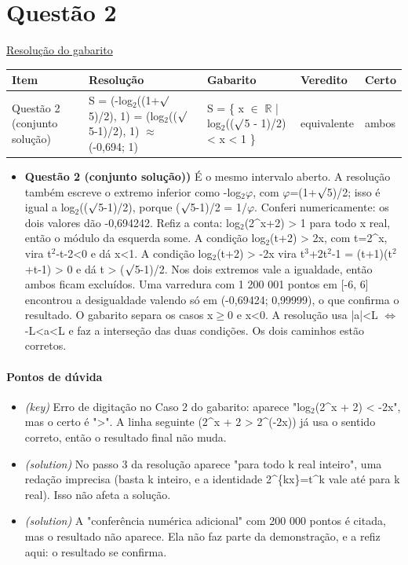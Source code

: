 \documentclass{article}%
\begin{document}
\section*{Questão 2}%
\href{https://poliedroresolve.sistemapoliedro.com.br/vestibulares/ita/2027/ita-2-fase-dia-1-20-10-2026-2-fase-dia-1/dissertativa-2-matematica-2-fase-dia-1-ita-2027}{Resolução do gabarito}\par\smallskip%
\begin{longtable}{@{}p{} p{} p{} p{} p{}@{}}\toprule Item & Resolução & Gabarito & Veredito & Certo \\ \midrule
Questão 2 (conjunto solução) & S = (-log$_{2}$((1+$\surd$5)/2), 1) = (log$_{2}$(($\surd$5-1)/2), 1) $\approx$ (-0,694; 1) & S = \{ x $\in$ $\mathbb{R}$ | log$_{2}$(($\surd$5 - 1)/2) < x < 1 \} & equivalente & ambos \\
\bottomrule\end{longtable}%
\begin{itemize}%
\item%
\textbf{Questão 2 (conjunto solução))} É o mesmo intervalo aberto. A resolução também escreve o extremo inferior como -log$_{2}$$\varphi$, com $\varphi$=(1+$\surd$5)/2; isso é igual a log$_{2}$(($\surd$5-1)/2), porque ($\surd$5-1)/2 = 1/$\varphi$. Conferi numericamente: os dois valores dão -0,694242. Refiz a conta: log$_{2}$(2\^{}x+2) > 1 para todo x real, então o módulo da esquerda some. A condição log$_{2}$(t+2) > 2x, com t=2\^{}x, vira t$^2$-t-2<0 e dá x<1. A condição log$_{2}$(t+2) > -2x vira t$^3$+2t$^2$-1 = (t+1)(t$^2$+t-1) > 0 e dá t > ($\surd$5-1)/2. Nos dois extremos vale a igualdade, então ambos ficam excluídos. Uma varredura com 1 200 001 pontos em {[}-6, 6{]} encontrou a desigualdade valendo só em (-0,69424; 0,99999), o que confirma o resultado. O gabarito separa os casos x$\geq$0 e x<0. A resolução usa |a|<L $\Leftrightarrow$ -L<a<L e faz a interseção das duas condições. Os dois caminhos estão corretos.%
\end{itemize}%
\paragraph{Pontos de dúvida}%
\begin{itemize}%
\item%
\textit{(key)} Erro de digitação no Caso 2 do gabarito: aparece "log$_{2}$(2\^{}x + 2) < -2x", mas o certo é ">". A linha seguinte (2\^{}x + 2 > 2\^{}(-2x)) já usa o sentido correto, então o resultado final não muda.%
\item%
\textit{(solution)} No passo 3 da resolução aparece "para todo k real inteiro", uma redação imprecisa (basta k inteiro, e a identidade 2\^{}\{kx\}=t\^{}k vale até para k real). Isso não afeta a solução.%
\item%
\textit{(solution)} A "conferência numérica adicional" com 200 000 pontos é citada, mas o resultado não aparece. Ela não faz parte da demonstração, e a refiz aqui: o resultado se confirma.%
\end{itemize}%
\end{document}
